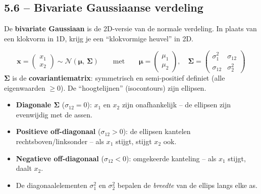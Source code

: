 \documentclass[a4paper,11pt]{article}
\begin{document}
\subsection{5.6 -- Bivariate Gaussiaanse verdeling}

De \textbf{bivariate Gaussiaan} is de 2D-versie van de normale verdeling. In plaats van een klokvorm in 1D, krijg je een ``klokvormige heuvel'' in 2D.

\begin{conceptbox}
\[\mathbf{x} = \begin{pmatrix}x_1\\x_2\end{pmatrix} \sim \mathcal{N}(\boldsymbol{\mu},\,\boldsymbol{\Sigma}) \qquad \text{met} \qquad \boldsymbol{\mu} = \begin{pmatrix}\mu_1\\\mu_2\end{pmatrix},\quad \boldsymbol{\Sigma} = \begin{pmatrix}\sigma_1^2 & \sigma_{12}\\ \sigma_{12} & \sigma_2^2\end{pmatrix}\]
$\boldsymbol{\Sigma}$ is de \textbf{covariantiematrix}: symmetrisch en semi-positief definiet (alle eigenwaarden $\geq 0$).
De ``hoogtelijnen'' (isocontours) zijn ellipsen.
\end{conceptbox}


\begin{conceptbox}
\begin{itemize}
  \item \textbf{Diagonale $\boldsymbol{\Sigma}$} ($\sigma_{12} = 0$): $x_1$ en $x_2$ zijn onafhankelijk -- de ellipsen zijn evenwijdig met de assen.
  \item \textbf{Positieve off-diagonaal} ($\sigma_{12} > 0$): de ellipsen kantelen rechtsboven/linksonder -- als $x_1$ stijgt, stijgt $x_2$ ook.
  \item \textbf{Negatieve off-diagonaal} ($\sigma_{12} < 0$): omgekeerde kanteling -- als $x_1$ stijgt, daalt $x_2$.
  \item De diagonaalelementen $\sigma_1^2$ en $\sigma_2^2$ bepalen de \emph{breedte} van de ellips langs elke as.
\end{itemize}
\end{conceptbox}
\end{document}
